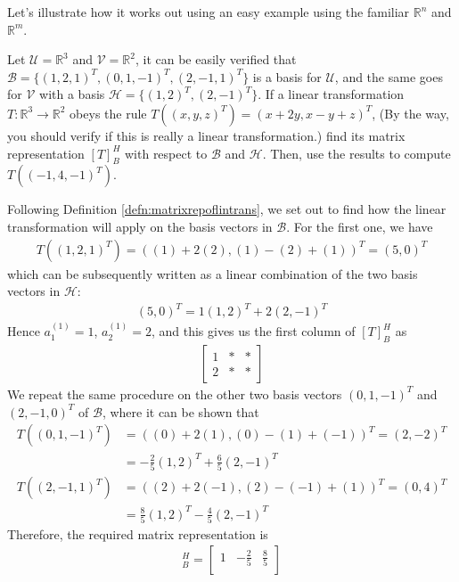 Let's illustrate how it works out using an easy example using the familiar $\mathbb{R}^n$ and $\mathbb{R}^m$. 
\begin{exmp}
\label{exmp:lineartransmatrixrep}
Let $\mathcal{U} = \mathbb{R}^3$ and $\mathcal{V} = \mathbb{R}^2$, it can be easily verified that $\mathcal{B} = \{(1,2,1)^T, (0,1,-1)^T, (2,-1,1)^T\}$ is a basis for $\mathcal{U}$, and the same goes for $\mathcal{V}$ with a basis $\mathcal{H} = \{(1,2)^T, (2,-1)^T\}$. If a linear transformation $T: \mathbb{R}^3 \to \mathbb{R}^2$ obeys the rule $T((x,y,z)^T) = (x+2y, x-y+z)^T$, (By the way, you should verify if this is really a linear transformation.) find its matrix representation $[T]_B^H$ with respect to $\mathcal{B}$ and $\mathcal{H}$. Then, use the results to compute $T((-1,4,-1)^T)$.
\end{exmp}
\begin{solution}
Following Definition \ref{defn:matrixrepoflintrans}, we set out to find how the linear transformation will apply on the basis vectors in $\mathcal{B}$. For the first one, we have
\begin{align*}
T((1,2,1)^T) = ((1)+2(2), (1)-(2)+(1))^T = (5,0)^T
\end{align*}
which can be subsequently written as a linear combination of the two basis vectors in $\mathcal{H}$:
\begin{align*}
(5,0)^T = 1(1,2)^T + 2(2,-1)^T
\end{align*}
Hence $a_1^{(1)} = 1$, $a_2^{(1)} = 2$, and this gives us the first column of $[T]_B^H$ as
\begin{align*}
\begin{bmatrix}
1 & * & * \\
2 & * & * 
\end{bmatrix}
\end{align*}
We repeat the same procedure on the other two basis vectors $(0,1,-1)^T$ and $(2,-1,0)^T$ of $\mathcal{B}$, where it can be shown that
\begin{align*}
T((0,1,-1)^T) &= ((0)+2(1), (0)-(1)+(-1))^T = (2,-2)^T \\
&= -\frac{2}{5}(1,2)^T + \frac{6}{5}(2,-1)^T \\
T((2,-1,1)^T) &= ((2)+2(-1), (2)-(-1)+(1))^T = (0,4)^T \\
&= \frac{8}{5}(1,2)^T - \frac{4}{5}(2,-1)^T
\end{align*}
Therefore, the required matrix representation is
\begin{align*}
[T]_B^H = 
\begin{bmatrix}
1 & -\frac{2}{5} & \frac{8}{5} \\

\end{bmatrix}
\end{align*}
\end{solution}
